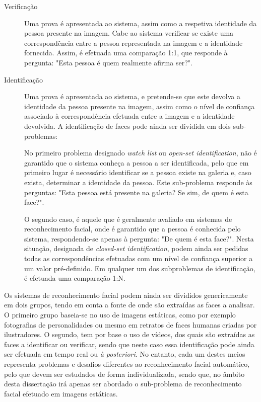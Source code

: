 \begin{description}
\item[Verificação] Uma prova é apresentada ao sistema, assim como a respetiva identidade da pessoa presente na imagem. Cabe ao sistema verificar se existe uma correspondência entre a pessoa representada na imagem e a identidade fornecida. Assim, é efetuada uma comparação 1:1, que responde à pergunta: "Esta pessoa é quem realmente afirma ser?".

\item[Identificação] Uma prova é apresentada ao sistema, e pretende-se que este devolva a identidade da pessoa presente na imagem, assim como o nível de confiança associado à correspondência efetuada entre a imagem e a identidade devolvida. A identificação de faces pode ainda ser dividida em dois sub-problemas: 

No primeiro problema designado \textit{watch list} ou \textit{open-set identification}\citep{Chellappa2010}, não é garantido que o sistema conheça a pessoa a ser identificada, pelo que em primeiro lugar é necessário identificar se a pessoa existe na galeria e, caso exista, determinar a identidade da pessoa. Este sub-problema responde às perguntas: "Esta pessoa está presente na galeria? Se sim, de quem é esta face?". 

O segundo caso, é aquele que é geralmente avaliado em sistemas de reconhecimento facial, onde é garantido que a pessoa é conhecida pelo sistema, respondendo-se apenas à pergunta: "De quem é esta face?". Nesta situação, designada de \textit{closed-set identification}, podem ainda ser pedidas todas as correspondências efetuadas com um nível de confiança superior a um valor pré-definido. 
Em qualquer um dos subproblemas de identificação, é efetuada uma comparação 1:N.
\end{description}

Os sistemas de reconhecimento facial podem ainda ser divididos genericamente em dois grupos, tendo em conta a fonte de onde são extraídas as faces a analisar. O primeiro grupo baseia-se no uso de imagens estáticas, como por exemplo fotografias de personalidades ou mesmo em retratos de faces humanas criadas por ilustradores. O segundo, tem por base o uso de vídeos, dos quais são extraídas as faces a identificar ou verificar, sendo que neste caso essa identificação pode ainda ser efetuada em tempo real ou \textit{à posteriori}. No entanto, cada um destes meios representa problemas e desafios diferentes ao reconhecimento facial automático, pelo que devem ser estudados de forma individualizada, sendo que, no âmbito desta dissertação irá apenas ser abordado o sub-problema de reconhecimento facial efetuado em imagens estáticas.

